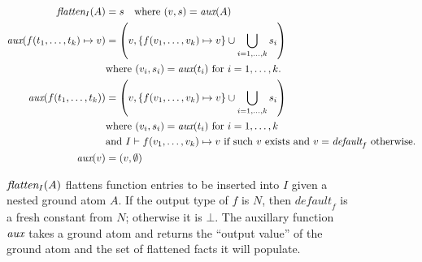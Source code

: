 \begin{figure}
\begin{align*}
    \textit{flatten}{}_I(A) &= s\quad \text{where $(v, s) = \textit{aux}{}(A)$}\\
    \textit{aux}{}(f(t_1,\ldots, t_k)\mapsto v)
      & = \left(
        v,
        \{f(v_1,\ldots, v_k)\mapsto v\}\cup \bigcup_{i=1,\ldots,k}s_i
      \right)\\
      & \text{where $(v_i, s_i)=\textit{aux}{}(t_i)$ for $i=1,\ldots,k$.}\\
    \textit{aux}{}(f(t_1,\ldots, t_k))
      & = \left(
        v,
        \{f(v_1,\ldots, v_k)\mapsto v\}\cup \bigcup_{i=1,\ldots,k}s_i
      \right)\\
      & \text{where $(v_i, s_i)=\textit{aux}{}(t_i)$ for $i=1,\ldots,k$}\\
      & \text{and $I\vdash f(v_1,\ldots, v_k)\mapsto v$ 
        if such $v$ exists and $v=\textit{default}_f$ otherwise.}\\
    \textit{aux}{}(v) &= \left(v, \emptyset\right)
\end{align*}
\caption{
$\textit{flatten}{}_I(A)$ 
 flattens function entries to be inserted 
 into $I$ given a nested ground atom $A$.
If the output type of $f$ is $N$,
 then $\textit{default}_f$ is a fresh constant from $N$; 
 otherwise it is $\bot$.
The auxillary function $\textit{aux}$ 
 takes a ground atom and
 returns the ``output value'' of the ground atom
 and the set of flattened facts
 it will populate.
}\label{fig:flatten}
\end{figure}

